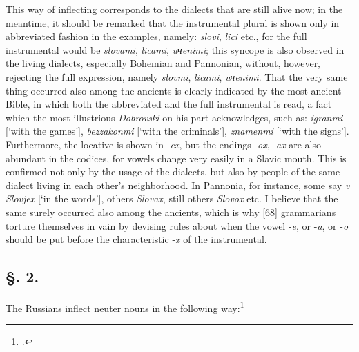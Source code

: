 This way of inflecting corresponds to the dialects that are still alive now; in the meantime, it should be remarked that the instrumental plural is shown only in abbreviated fashion in the examples, namely: \textit{slovi}, \textit{lici} etc., for the full instrumental would be \textit{slovami}, \textit{licami}, \textit{uчenimi}; this syncope is also observed in the living dialects, especially Bohemian and Pannonian, without, however, rejecting the full expression, namely \textit{slovmi}, \textit{licami}, \textit{uчenimi}. That the very same thing occurred also among the ancients is clearly indicated by the most ancient Bible, in which both the abbreviated and the full instrumental is read, a fact which the most illustrious \textit{Dobrovski} on his part acknowledges, such as: \textit{igranmi} [‘with the games’], \textit{bezzakonmi} [‘with the criminals’], \textit{znamenmi} [‘with the signs’]. Furthermore, the locative is shown in -\textit{ex}, but the endings -\textit{ox}, -\textit{ax} are also abundant in the codices, for vowels change very easily in a Slavic mouth. This is confirmed not only by the usage of the dialects, but also by people of the same dialect living in each other’s neighborhood. In Pannonia, for instance, some say \textit{v Slovjex} [‘in the words’], others \textit{Slovax}, still others \textit{Slovox} etc. I believe that the same surely occurred also among the ancients, which is why [68] grammarians torture themselves in vain by devising rules about when the vowel -\textit{e}, or -\textit{a}, or -\textit{o} should be put before the characteristic -\textit{x} of the instrumental.

\subsection*{\hspace*{\fill}§. 2.\hspace*{\fill}}

The Russians inflect neuter nouns in the following way:\footnote{\citet[table insert at 204--205]{puchmayer_lehrgebaude_1820}.}

